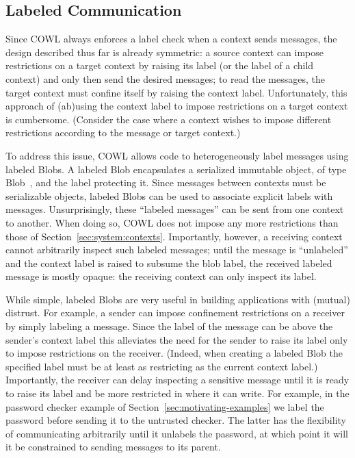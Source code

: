 \subsection{Labeled Communication}
\label{sec:system:communication}
Since COWL always enforces a label check when a context sends
messages, the design described thus far is already symmetric: a source
context can impose restrictions on a target context by raising its
label (or the label of a child context) and only then send the desired
messages; to read the messages, the target context must confine itself
by raising the context label.
%
Unfortunately, this approach of (ab)using the context label to impose
restrictions on a target context is cumbersome.
%
(Consider the case where a context wishes to impose different
restrictions according to the message or target context.)

To address this issue, COWL allows code to heterogeneously label
messages using labeled Blobs.
%
A labeled Blob encapsulates a serialized immutable object, of type
Blob~\cite{html5}, and the label protecting it.
%
Since messages between contexts must be serializable objects, labeled
Blobs can be used to associate explicit labels with messages.
%
Unsurprisingly, these ``labeled messages'' can be sent from one
context to another.
%
When doing so, COWL does not impose any more restrictions than those of
Section~\ref{sec:system:contexts}.
%
Importantly, however, a receiving context cannot arbitrarily inspect
such labeled messages;
%
until the message is ``unlabeled'' and the context label is raised to
subsume the blob label, the received labeled message is mostly opaque:
the receiving context can only inspect its label.

While simple, labeled Blobs are very useful in building applications
with (mutual) distrust.
%
For example, a sender can impose confinement restrictions on a
receiver by simply labeling a message.
%
Since the label of the message can be above the sender's context label
this alleviates the need for the sender to raise its label only to
impose restrictions on the receiver.
%
(Indeed, when creating a labeled Blob the specified label must be at
least as restricting as the current context label.)
%
Importantly, the receiver can delay inspecting a sensitive message
until it is ready to raise its label and be more restricted in where
it can write.
%
For example, in the password checker example of
Section~\ref{sec:motivating-examples} we label the password
 before sending it to the untrusted checker.
%
The latter has the flexibility of communicating arbitrarily until
it unlabels the password, at which point it will it be constrained to
sending messages to its parent.



